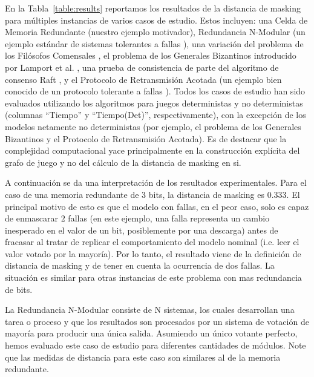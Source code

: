 En la Tabla~\ref{table:results} reportamos los resultados de la distancia de masking para múltiples instancias de varios casos de estudio. Estos incluyen: una Celda de Memoria Redundante (nuestro ejemplo motivador), Redundancia N-Modular (un ejemplo estándar de sistemas tolerantes a fallas \cite{ShoomanBook}), una variación del problema de los Filósofos Comensales \cite{Dijkstra71}, el problema de los Generales Bizantinos introducido por Lamport et al. \cite{LamportSP82}, una prueba de consistencia de parte del algoritmo de consenso Raft \cite{OngaroO14}, y el Protocolo de Retransmisión Acotada (un ejemplo bien conocido de un protocolo tolerante a fallas \cite{GrooteP96}). Todos los casos de estudio han sido evaluados utilizando los algoritmos para juegos deterministas y no deterministas (columnas ``Tiempo'' y ``Tiempo(Det)'', respectivamente), con la excepción de los modelos netamente no deterministas (por ejemplo, el problema de los Generales Bizantinos y el Protocolo de Retransmisión Acotada). Es de destacar que la complejidad computacional yace principalmente en la construcción explícita del grafo de juego y no del cálculo de la distancia de masking en si.

A continuación se da una interpretación de los resultados experimentales. Para el caso de una memoria redundante de $3$ bits, la distancia de masking es $0.333$. El principal motivo de esto es que el modelo con fallas, en el peor caso, solo es capaz de enmascarar $2$ fallas (en este ejemplo, una falla representa un cambio inesperado en el valor de un bit, posiblemente por una descarga) antes de fracasar al tratar de replicar el comportamiento del modelo nominal (i.e. leer el valor votado por la mayoría). Por lo tanto, el resultado viene de la definición de distancia de masking y de tener en cuenta la ocurrencia de dos fallas. La situación es similar para otras instancias de este problema con mas redundancia de bits.

La Redundancia N-Modular consiste de N sistemas, los cuales desarrollan una tarea o proceso y que los resultados son procesados por un sistema de votación de mayoría para producir una única salida. 
Asumiendo un único votante perfecto, hemos evaluado este caso de estudio para diferentes cantidades de módulos.
Note que las medidas de distancia para este caso son similares al de la memoria redundante. 

